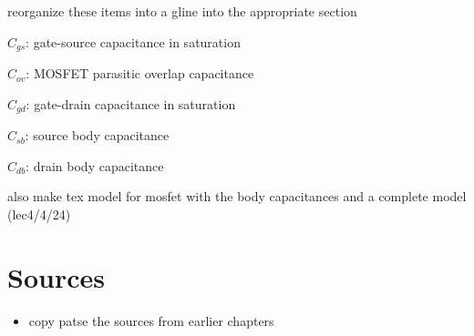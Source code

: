 \begin{todo}
    \item reorganize these items into a gline into the appropriate section
    \item $C_{gs}$: gate-source capacitance in saturation
    \item $C_{ov}$: MOSFET parasitic overlap capacitance
    \item $C_{gd}$: gate-drain capacitance in saturation
    \item $C_{sb}$: source body capacitance
    \item $C_{db}$: drain body capacitance
    \item also make tex model for mosfet with the body capacitances and a complete model (lec4/4/24)
\end{todo}


\section{Sources}
\begin{itemize}
    \item copy patse the sources from earlier chapters
\end{itemize}